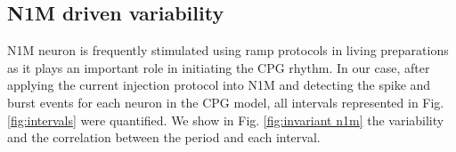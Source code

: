 \subsection{N1M driven variability}
\label{subsec:n1m driven}

N1M neuron is frequently stimulated using ramp protocols in living preparations \parencite{Elliott1991} as it plays an important role in initiating the CPG rhythm. In our case, after applying the current injection protocol into N1M and detecting the spike and burst events for each neuron in the CPG model, all  intervals represented in Fig. \ref{fig:intervals} were quantified. We show in Fig. \ref{fig:invariant n1m} the variability and the correlation between the period and each interval.

\begin{figure}[hbt!]
	\begin{minipage}[b]{0.45\textwidth}
		\centering

\end{minipage}
\end{figure}
